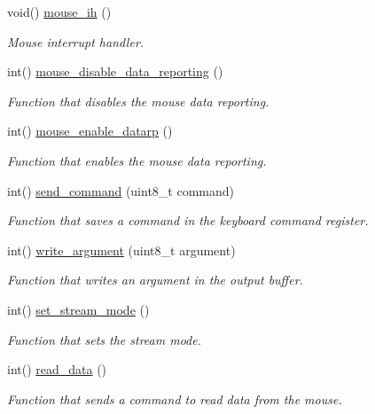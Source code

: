 \begin{DoxyCompactItemize}
void() \hyperlink{group__mouse_ga210374b50462acdedab00df64d5cea3c}{mouse\+\_\+ih} ()
\begin{DoxyCompactList}\small\item\em Mouse interrupt handler. \end{DoxyCompactList}\item 
int() \hyperlink{group__mouse_ga7e311379d4d64f88873ef8ade5c82a25}{mouse\+\_\+disable\+\_\+data\+\_\+reporting} ()
\begin{DoxyCompactList}\small\item\em Function that disables the mouse data reporting. \end{DoxyCompactList}\item 
int() \hyperlink{group__mouse_ga90562ec8e969e4014d728adb0fc91e31}{mouse\+\_\+enable\+\_\+datarp} ()
\begin{DoxyCompactList}\small\item\em Function that enables the mouse data reporting. \end{DoxyCompactList}\item 
int() \hyperlink{group__mouse_ga926121b9c6d89ac8825f115e3eb8dac3}{send\+\_\+command} (uint8\+\_\+t command)
\begin{DoxyCompactList}\small\item\em Function that saves a command in the keyboard command register. \end{DoxyCompactList}\item 
int() \hyperlink{group__mouse_ga4f9755f5c9975e9b13daa3e34f26f5cf}{write\+\_\+argument} (uint8\+\_\+t argument)
\begin{DoxyCompactList}\small\item\em Function that writes an argument in the output buffer. \end{DoxyCompactList}\item 
int() \hyperlink{group__mouse_ga58c043049bb31ec7bad65594a8341a5d}{set\+\_\+stream\+\_\+mode} ()
\begin{DoxyCompactList}\small\item\em Function that sets the stream mode. \end{DoxyCompactList}\item 
int() \hyperlink{group__mouse_gad25b8bf71166026dbf192c6d013d54d6}{read\+\_\+data} ()
\begin{DoxyCompactList}\small\item\em Function that sends a command to read data from the mouse. \end{DoxyCompactList}\end{DoxyCompactItemize}


